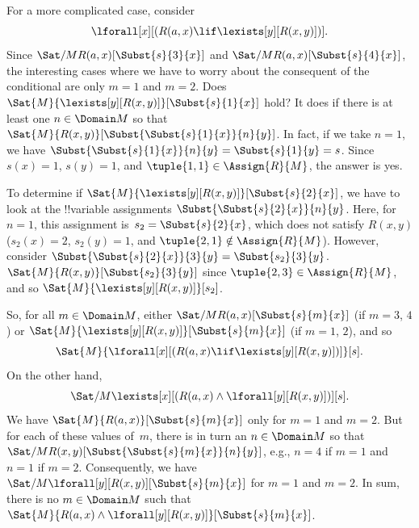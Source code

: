 \documentclass[../../../include/open-logic-section]{subfiles}
\begin{document}
\begin{ex}

For a more complicated case, consider
\[
\lforall[x][(R(a,x) \lif \lexists[y][R(x,y)])].
\]
Since $\Sat/{M}{R(a,x)}[\Subst{s}{3}{x}]$ and
$\Sat/{M}{R(a,x)}[\Subst{s}{4}{x}]$, the interesting cases where we
have to worry about the consequent of the conditional are only $m = 1$
and $m = 2$. Does $\Sat{M}{\lexists[y][R(x,y)]}[\Subst{s}{1}{x}]$
hold? It does if there is at least one $n \in \Domain M$ so that
$\Sat{M}{R(x,y)}[\Subst{\Subst{s}{1}{x}}{n}{y}]$. In fact, if we take
$n = 1$, we have $\Subst{\Subst{s}{1}{x}}{n}{y} = \Subst{s}{1}{y} =
s$. Since $s(x) = 1$, $s(y) = 1$, and $\tuple{1,1} \in \Assign{R}{M}$,
the answer is yes. 

To determine if $\Sat{M}{\lexists[y][R(x,y)]}[\Subst{s}{2}{x}]$, we
have to look at the !!{variable} assignments
$\Subst{\Subst{s}{2}{x}}{n}{y}$. Here, for $n = 1$, this assignment
is~$s_2 = \Subst{s}{2}{x}$, which does not satisfy $R(x,y)$ ($s_2(x) =
2$, $s_2(y) = 1$, and $\tuple{2,1}\notin \Assign{R}{M}$). However,
consider $\Subst{\Subst{s}{2}{x}}{3}{y} = \Subst{s_2}{3}{y}$.
$\Sat{M}{R(x,y)}[\Subst{s_2}{3}{y}]$ since $\tuple{2,3} \in
\Assign{R}{M}$, and so $\Sat{M}{\lexists[y][R(x,y)]}[s_2]$.

So, for all $m \in \Domain M$, either
$\Sat/{M}{R(a,x)}[\Subst{s}{m}{x}]$ (if $m = 3$, $4$) or
$\Sat{M}{\lexists[y][R(x,y)]}[\Subst{s}{m}{x}]$ (if $m = 1$, $2$), and so
\[
\Sat{M}{\lforall[x][(R(a,x) \lif \lexists[y][R(x,y)])]}[s].
\]
On the other hand,
\[
\Sat/{M}{\lexists[x][(R(a,x) \land \lforall[y][R(x,y)])]}[s].
\]
We have $\Sat{M}{R(a,x)}[\Subst{s}{m}{x}]$ only for $m = 1$ and $m =
2$. But for each of these values of~$m$, there is in turn an $n \in
\Domain M$ so that $\Sat/{M}{R(x,y)}[\Subst{\Subst{s}{m}{x}}{n}{y}]$,
e.g., $n=4$ if $m=1$ and $n=1$ if $m=2$. Consequently, we have
$\Sat/{M}{\lforall[y][R(x,y)]}[\Subst{s}{m}{x}]$ for $m = 1$ and $m =
2$. In sum, there is no $m \in \Domain M$ such that $\Sat{M}{R(a,x)
\land \lforall[y][R(x,y)]}[\Subst{s}{m}{x}]$.
\end{ex}
\end{document}
